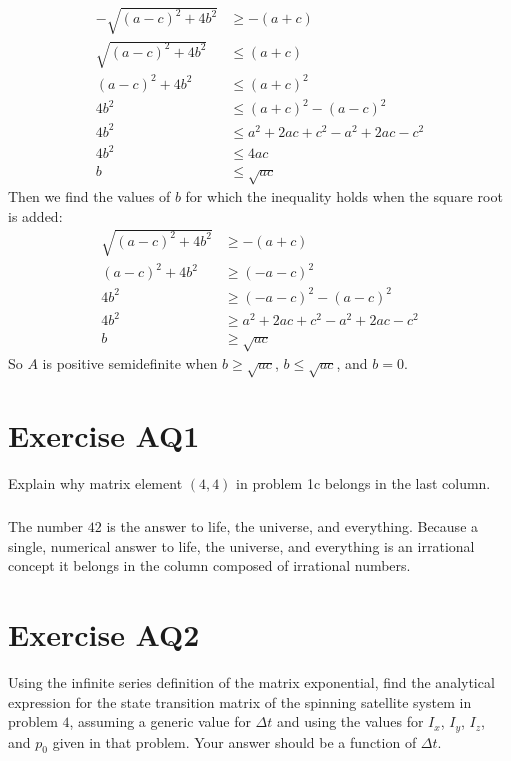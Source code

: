 \documentclass[11pt]{article}
\begin{document}
\begin{align*}
	-\sqrt{(a-c)^2+4b^2} &\geq -(a+c) \\
	\sqrt{(a-c)^2+4b^2} &\leq (a+c) \\
	(a-c)^2+4b^2 &\leq (a+c)^2 \\
	4b^2 &\leq (a+c)^2 - (a-c)^2 \\
	4b^2 &\leq a^2+2ac+c^2-a^2+2ac-c^2 \\
	4b^2 &\leq 4ac \\
	b &\leq \sqrt{ac}
\end{align*}
Then we find the values of $b$ for which the inequality holds when the square root is added:
\begin{align*}
	\sqrt{(a-c)^2+4b^2} &\geq -(a+c) \\
	(a-c)^2+4b^2 &\geq (-a-c)^2 \\
	4b^2 &\geq (-a-c)^2 - (a-c)^2 \\
	4b^2 &\geq a^2+2ac+c^2-a^2+2ac-c^2 \\
	b &\geq \sqrt{ac}
\end{align*}
So $A$ is positive semidefinite when $b\geq\sqrt{ac}$, $b\leq\sqrt{ac}$, and $b=0$.

\section*{Exercise AQ1}
Explain why matrix element $(4,4)$ in problem 1c belongs in the last column.
\subparagraph*{}
The number $42$ is the answer to life, the universe, and everything. Because a single, numerical answer to life, the universe, and everything is an irrational concept it belongs in the column composed of irrational numbers.

\section*{Exercise AQ2}
Using the infinite series definition of the matrix exponential, find the analytical expression for the state transition matrix of the spinning satellite system in problem $4$, assuming a generic value for $\Delta t$ and using the values for $I_x$, $I_y$, $I_z$, and $p_0$ given in that problem. Your answer should be a function of $\Delta t$. 
\end{document}
